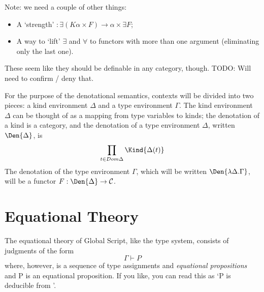 \documentclass{report}
\newcommand\sequent\vdash
\begin{document}
Note: we need a couple of other things:
\begin{itemize}
    \item A `strength' $: \exists (K\alpha \times F) \to \alpha \times \exists F$;
    \item A way to `lift' $\exists$ and $\forall$ to functors with more than one argument (eliminating only the last one).
\end{itemize}
These seem like they should be definable in any category, though.
TODO: Will need to confirm / deny that.

For the purpose of the denotational semantics, contexts will be divided into two pieces:
a kind environment $\Delta$ and a type environment $\Gamma$.
The kind environment $\Delta$ can be thought of as a mapping from type variables to kinds;
the denotation of a kind is a category, and the denotation of a type environment $\Delta$, written $\Den{\Delta}$, is
\begin{displaymath}
    \prod_{t\in Dom\Delta}\Kind{\Delta(t)}
\end{displaymath}
The denotation of the type environment $\Gamma$, which will be written $\Den{\lambda\Delta.\Gamma}$, will be a functor $F : \Den{\Delta} \to \mathcal{C}$.

\section{Equational Theory}

The equational theory of Global Script, like the type system, consists of judgments of the form
\begin{equation}
    \Gamma \sequent P
\end{equation}
where, however, \<\Gamma\> is a sequence of type assignments and \emph{equational propositions} and \<P\> is an equational proposition.
If you like, you can read this as `\<P\> is deducible from \<\Gamma\>'.
\end{document}
